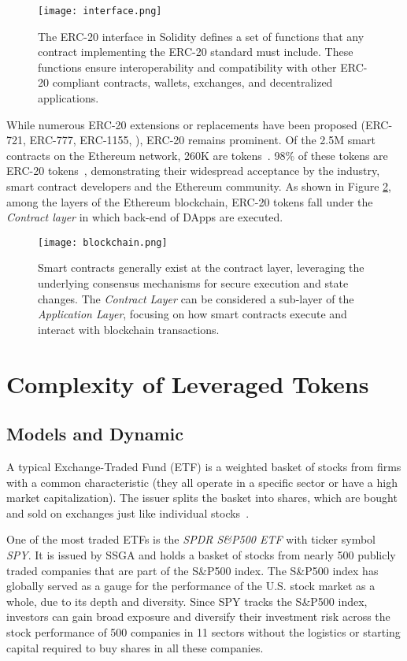 \begin{figure}[t]
	\centering
	\texttt{[image: interface.png]}
	\caption[The ERC-20 interface in Solidity]{The ERC-20 interface in Solidity defines a set of functions that any contract implementing the ERC-20 standard must include. These functions ensure interoperability and compatibility with other ERC-20 compliant contracts, wallets, exchanges, and decentralized applications.}
	\label{fig:interface}
\end{figure}

While numerous ERC-20 extensions or replacements have been proposed (\eg ERC-721, ERC-777, ERC-1155, \etc), ERC-20 remains prominent. Of the 2.5M smart contracts on the Ethereum network, 260K are tokens~\cite{TokenTracker}. 98\% of these tokens are ERC-20 tokens~\cite{TokenTracker}, demonstrating their widespread acceptance by the industry, smart contract developers and the Ethereum community. As shown in Figure \ref{fig:layers}, among the layers of the Ethereum blockchain, ERC-20 tokens fall under the \textit{Contract layer} in which back-end of DApps are executed.

\begin{figure}[t]
	\centering
	\texttt{[image: blockchain.png]}
	\caption[Ethereum layers and Smart Contract execution]{Smart contracts generally exist at the contract layer, leveraging the underlying consensus mechanisms for secure execution and state changes. The \textit{Contract Layer} can be considered a sub-layer of the \textit{Application Layer}, focusing on how smart contracts execute and interact with blockchain transactions.}
	\label{fig:layers}
\end{figure}

\section{Complexity of Leveraged Tokens}

\subsection{Models and Dynamic}
A typical Exchange-Traded Fund (ETF) is a weighted basket of stocks from firms with a common characteristic (\eg they all operate in a specific sector or have a high market capitalization). The issuer splits the basket into shares, which are bought and sold on exchanges just like individual stocks~\cite{liebi2020effect}.
\begin{example}
	One of the most traded ETFs is the \textsl{SPDR S\&P500 ETF} with ticker symbol \textsl{SPY}. It is issued by SSGA and holds a basket of stocks from nearly 500 publicly traded companies that are part of the S\&P500 index. The S\&P500 index has globally served as a gauge for the performance of the U.S. stock market as a whole, due to its depth and diversity. Since SPY tracks the S\&P500 index, investors can gain broad exposure and diversify their investment risk across the stock performance of 500 companies in 11 sectors without the logistics or starting capital required to buy shares in all these companies.
\end{example}

